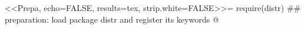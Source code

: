 <<Prepa, echo=FALSE, results=tex, strip.white=FALSE>>=
require(distr)
## preparation: load package distr and register its keywords
@
